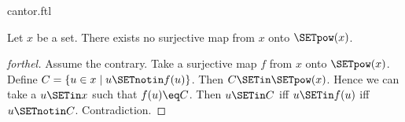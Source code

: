 \documentclass{naproche-library}
\begin{document}
\begin{smodule}[title=Cantor's Theorem]{cantor.ftl}

\begin{theorem}[forthel,title=Cantor's Theorem,id=cantor_017529138285230]
  Let $x$ be a set.
  There exists no surjective map from $x$ onto $\SETpow(x)$.
\end{theorem}
\begin{proof}[forthel]
  Assume the contrary.
  Take a surjective map $f$ from $x$ onto $\SETpow(x)$.
  Define $C = \{ u \in x \mid u \SETnotin f(u) \}$.
  Then $C \SETin \SETpow(x)$.
  Hence we can take a $u \SETin x$ such that $f(u) \eq C$.
  Then $u \SETin C$ iff $u \SETin f(u)$ iff $u \SETnotin C$.
  Contradiction.
\end{proof}
\end{smodule}
\end{document}
